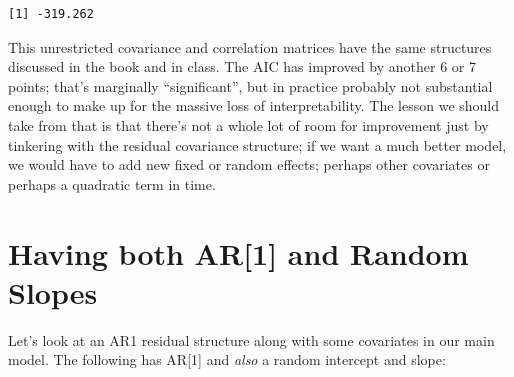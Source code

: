 \documentclass[
  letterpaper,
  DIV=11,
  numbers=noendperiod]{scrreprt}
\newenvironment{Shaded}{}{}
\newcommand{\AttributeTok}[1]{\textcolor[rgb]{0.49,0.56,0.16}{#1}}
\newcommand{\DecValTok}[1]{\textcolor[rgb]{0.25,0.63,0.44}{#1}}
\newcommand{\FunctionTok}[1]{\textcolor[rgb]{0.02,0.16,0.49}{#1}}
\newcommand{\NormalTok}[1]{#1}
\newcommand{\OtherTok}[1]{\textcolor[rgb]{0.00,0.44,0.13}{#1}}
\newcommand{\SpecialCharTok}[1]{\textcolor[rgb]{0.25,0.44,0.63}{#1}}
\newcommand{\StringTok}[1]{\textcolor[rgb]{0.25,0.44,0.63}{#1}}
\begin{document}
\begin{verbatim}
[1] -319.262
\end{verbatim}

This unrestricted covariance and correlation matrices have the same
structures discussed in the book and in class. The AIC has improved by
another 6 or 7 points; that's marginally ``significant'', but in
practice probably not substantial enough to make up for the massive loss
of interpretability. The lesson we should take from that is that there's
not a whole lot of room for improvement just by tinkering with the
residual covariance structure; if we want a much better model, we would
have to add new fixed or random effects; perhaps other covariates or
perhaps a quadratic term in time.

\section{Having both AR{[}1{]} and Random
Slopes}\label{having-both-ar1-and-random-slopes}

Let's look at an AR1 residual structure along with some covariates in
our main model. The following has AR{[}1{]} and \emph{also} a random
intercept and slope:

\begin{Shaded}
\end{Shaded}
\end{document}

